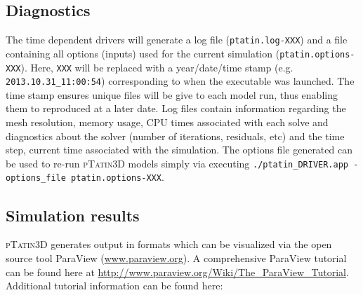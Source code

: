 \documentclass[paper=a4, fontsize=11pt,twoside]{scrartcl}
\newcommand{\ptat}{{{\textsc{pTatin3D}}}}
\newcommand{\unix}[1]{\texttt{\footnotesize #1}}
\begin{document}
{{\subsection{Diagnostics}
The time dependent drivers will generate a log file (\texttt{ptatin.log-XXX}) and a file containing all options (inputs) used for the current simulation (\texttt{ptatin.options-XXX}). Here, \texttt{XXX} will be replaced with a year/date/time stamp (e.g. \texttt{2013.10.31\_11:00:54}) corresponding to when the executable was launched. The time stamp ensures unique files will be give to each model run, thus enabling them to reproduced at a later date. Log files contain information regarding the mesh resolution, memory usage, CPU times associated with each solve and diagnostics about the solver (number of iterations, residuals, etc) and the time step, current time associated with the simulation. The options file generated can be used to re-run {\ptat} models simply via executing \unix{./ptatin\_DRIVER.app -options\_file ptatin.options-XXX}.

\subsection{Simulation results}
{\ptat} generates output in formats which can be visualized via the open source tool ParaView (\url{www.paraview.org}).
A comprehensive ParaView tutorial can be found here at \url{http://www.paraview.org/Wiki/The\_ParaView\_Tutorial}. 
Additional tutorial information can be found here:
}}
\end{document}

